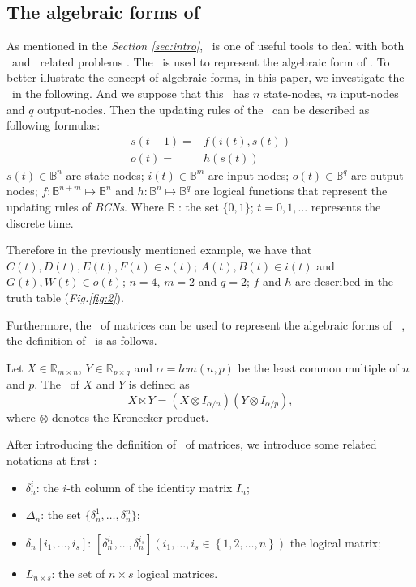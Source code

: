 \subsection{The algebraic forms of \BCNs}
As mentioned in the {\em Section \ref{sec:intro}}, \STP\ is one of useful tools to deal with  both \BNs\ and \BCNs\  related problems \cite{cheng2009controllability}. The \STP\ is used to represent the algebraic form of \BCN. To better illustrate the concept of algebraic forms, in this paper, we investigate the \BCN\ in the following. And we suppose that this \BCN\ has $n$ state-nodes, $m$ input-nodes and $q$ output-nodes. Then the updating rules of the \BCN\ can be described as following formulas:
\begin{equation}
\begin{split}
s(t+1)=&f(i(t),s(t))\\
o(t)=&h(s(t))
\end{split}
\label{equ:1}
\end{equation}
$s(t)\in \mathbb{B}^n$ are state-nodes; $i(t)\in \mathbb{B}^m$ are input-nodes; $o(t)\in \mathbb{B}^q$ are output-nodes; $f:\mathbb{B}^{n+m}\mapsto \mathbb{B}^n$ and $h:\mathbb{B}^n\mapsto \mathbb{B}^q$ are logical functions that represent the updating rules of {\em BCNs}. Where $\mathbb{B}$ : the set $\{0,1\}$; $t=0,1,\ldots$ represents the discrete time. 

Therefore in the previously mentioned example, we have that $C(t), D(t), E(t), F(t)\in s(t)$; $A(t), B(t)\in i(t)$ and $G(t), W(t)\in o(t)$; $n=4$, $m=2$ and $q=2$; $f$ and $h$ are described in the truth table ({\em Fig.\ref{fig:2}}). 

Furthermore, the \STP\ of matrices can be used to represent the algebraic forms of \BCNs\ \cite{cheng2009controllability}, the definition of \STP\ is as follows.

\begin{definition}[STP] 
	\cite{Cheng2011Analysis} Let $X\in\mathbb{R}_{m\times n}$, $Y\in\mathbb{R}_{p\times q}$ and $\alpha=lcm(n,p)$ be the least common multiple of $n$ and $p$. The \STP\ of $X$ and $Y$ is defined as \[X\ltimes Y=(X\otimes I_{\alpha/n})(Y\otimes I_{\alpha/p}),\] where $\otimes$ denotes the Kronecker product. 
\end{definition}

After introducing the definition of \STP\ of matrices,  we introduce some related notations at first \cite{Zhang2016Observability}:
\begin{itemize}
  \item $\delta^i_n$: the $i$-th column of the identity matrix $I_n$;
  \item $\Delta_n$: the set $\{\delta^1_n,\ldots,\delta^n_n \}$; 
  \item $\delta_n \left[i_1,\ldots,i_s\right]$: $\left[\delta^{i_1}_n,\ldots,\delta^{i_s}_n\right]\left(i_1,\ldots,i_s\in\left\{1,2,\ldots,n\right\}\right)$ the logical matrix;
  \item  $L_{n\times s}$: the set of $n\times s$ logical matrices.
\end{itemize}


